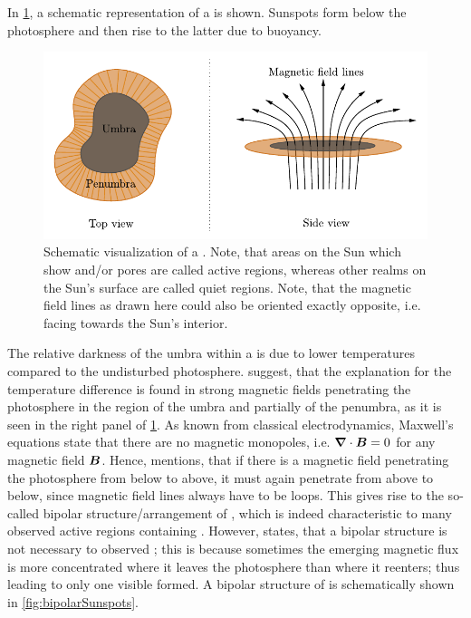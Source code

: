 \documentclass[a4paper,12pt]{report}
\def\lk#1{{\color{black}{#1}}}
\begin{document}
In \cref{fig:Sunspotsschematic}, a schematic representation of a \lk{sunspot} is shown. Sunspots form below the photosphere and then rise to the latter due to buoyancy.
\begin{figure}[h]
\centering
\includegraphics[width=\textwidth-2cm]{figures/Sunspotsschematic.pdf}
\caption{Schematic visualization of a \lk{sunspot}. Note, that areas on the Sun which show \lk{sunspots} and/or pores are called active regions, whereas other realms on the Sun's surface are called quiet regions. Note, that the magnetic field lines as drawn here could also be oriented exactly opposite, i.e. facing towards the Sun's interior.}
\label{fig:Sunspotsschematic}
\end{figure}
The relative darkness of the umbra within a \lk{sunspot} is due to lower temperatures compared to the undisturbed photosphere. \cite[p.142]{Weigert.2006} suggest, that the explanation for the temperature difference is found in strong magnetic fields penetrating the photosphere in the region of the umbra and partially of the penumbra, as it is seen in the right panel of \cref{fig:Sunspotsschematic}. As known from classical electrodynamics, Maxwell's equations state that there are no magnetic monopoles, i.e. $\bm{\nabla}\cdot \bm{B} = 0$ for any magnetic field $\bm{B}$. Hence, \cite[p.342]{Stix.2002} mentions, that if there is a magnetic field penetrating the photosphere from below to above, it must again penetrate from above to below, since magnetic field lines always have to be loops. This gives rise to the so-called bipolar structure/arrangement of \lk{sunspots}, which is indeed characteristic to many observed active regions containing \lk{sunspots}. However, \cite[p.342]{Stix.2002} states, that a bipolar structure is not necessary to observed \lk{sunspots}; this is because sometimes the emerging magnetic flux is more concentrated where it leaves the photosphere than where it reenters; thus leading to only one visible \lk{sunspot} formed. A bipolar structure of \lk{sunspots} is schematically shown in \cref{fig:bipolarSunspots}.
\end{document}
